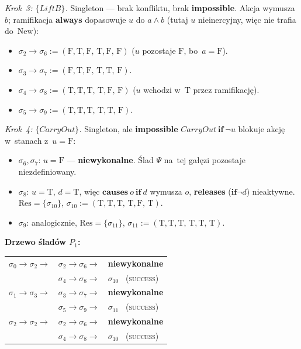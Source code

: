 \documentclass[11pt,a4paper]{article}
\newcommand{\causes}{\textbf{causes}}
\renewcommand{\iff}{\textbf{if}}
\newcommand{\always}{\textbf{always}}
\newcommand{\impossible}{\textbf{impossible}}
\newcommand{\releases}{\textbf{releases}}
\theoremstyle{definition}
\begin{document}
\medskip
\noindent\textit{Krok~3: $\{\mathit{LiftB}\}$.} Singleton --- brak konfliktu,
brak \impossible{}. Akcja wymusza $b$; ramifikacja \always{}
dopasowuje $u$ do $a \land b$ (tutaj $u$ nieinercyjny, więc nie trafia do~$\mathrm{New}$):
\begin{itemize}[topsep=2pt]
  \item $\sigma_2 \to \sigma_6 := (\text{F},\text{T},\text{F},\,\text{T},\text{F},\,\text{F})$
        ($u$ pozostaje $\text{F}$, bo~$a = \text{F}$).
  \item $\sigma_3 \to \sigma_7 := (\text{F},\text{T},\text{F},\,\text{T},\text{T},\,\text{F})$.
  \item $\sigma_4 \to \sigma_8 := (\text{T},\text{T},\text{T},\,\text{T},\text{F},\,\text{F})$
        ($u$ wchodzi w~$\text{T}$ przez ramifikację).
  \item $\sigma_5 \to \sigma_9 := (\text{T},\text{T},\text{T},\,\text{T},\text{T},\,\text{F})$.
\end{itemize}

\medskip
\noindent\textit{Krok~4: $\{\mathit{CarryOut}\}$.}
Singleton, ale \impossible{} $\mathit{CarryOut}\ \iff\ \neg u$
blokuje akcję w~stanach z~$u = \text{F}$:
\begin{itemize}[topsep=2pt]
  \item $\sigma_6, \sigma_7$: $u = \text{F}$ --- \textbf{niewykonalne}.
        Ślad $\Psi$ na~tej gałęzi pozostaje niezdefiniowany.
  \item $\sigma_8$: $u = \text{T}$, $d = \text{T}$, więc $\causes\ o\ \iff\ d$ wymusza $o$,
        \releases{} ($\iff \neg d$) nieaktywne. $\mathrm{Res} = \{\sigma_{10}\}$,
        $\sigma_{10} := (\text{T},\text{T},\text{T},\,\text{T},\text{F},\,\text{T})$.
  \item $\sigma_9$: analogicznie, $\mathrm{Res} = \{\sigma_{11}\}$,
        $\sigma_{11} := (\text{T},\text{T},\text{T},\,\text{T},\text{T},\,\text{T})$.
\end{itemize}

\medskip
\noindent\textbf{Drzewo śladów $P_1$:}
\begin{center}
\begin{tabular}{@{}l@{\ }c@{\ }l@{}}
$\sigma_0 \to \sigma_2 \to$ & $\sigma_2 \to \sigma_6 \to$ & \textbf{niewykonalne} \\
                            & $\sigma_4 \to \sigma_8 \to$ & $\sigma_{10}$ \ (\textsc{success}) \\[2pt]
$\sigma_1 \to \sigma_3 \to$ & $\sigma_3 \to \sigma_7 \to$ & \textbf{niewykonalne} \\
                            & $\sigma_5 \to \sigma_9 \to$ & $\sigma_{11}$ \ (\textsc{success}) \\[2pt]
$\sigma_2 \to \sigma_2 \to$ & $\sigma_2 \to \sigma_6 \to$ & \textbf{niewykonalne} \\
                            & $\sigma_4 \to \sigma_8 \to$ & $\sigma_{10}$ \ (\textsc{success}) \\
\end{tabular}
\end{center}
\end{document}
